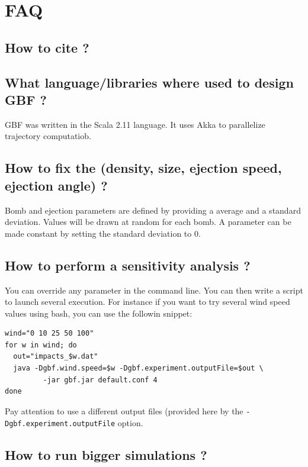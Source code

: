 \documentclass[10pt,a4paper]{article}
\begin{document}
\section{FAQ}
\label{sec-6}

\subsection{How to cite ?}
\label{sec-6-1}
\subsection{What language/libraries where used to design GBF ?}
\label{sec-6-2}

GBF was written in the Scala 2.11 language. It uses Akka to
parallelize trajectory computatiob.

\subsection{How to fix the (density, size, ejection speed, ejection angle) ?}
\label{sec-6-3}

Bomb and ejection parameters are defined by providing a average and a
standard deviation. Values will be drawn at random for each bomb. A parameter
can be made constant by setting the standard deviation to 0.

\subsection{How to perform a sensitivity analysis ?}
\label{sec-6-4}

You can override any parameter in the command line. You can then write
a script to launch several execution. For instance if you want to try
several wind speed values using bash, you can use the followin snippet:

\begin{verbatim}
wind="0 10 25 50 100"
for w in wind; do
  out="impacts_$w.dat"
  java -Dgbf.wind.speed=$w -Dgbf.experiment.outputFile=$out \
         -jar gbf.jar default.conf 4
done
\end{verbatim}

Pay attention to use a different output files (provided here by the
\texttt{-Dgbf.experiment.outputFile} option.

\subsection{How to run bigger simulations ?}
\label{sec-6-5}
\end{document}
